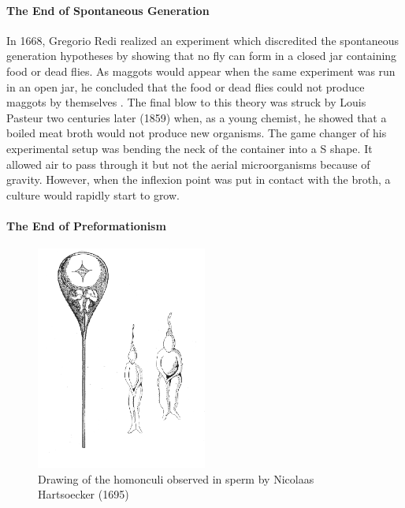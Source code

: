 \paragraph{The End of Spontaneous Generation}


In 1668, Gregorio Redi realized an experiment which discredited the spontaneous generation hypotheses by showing that no fly can form in a closed jar containing food or dead flies. As maggots would appear when the same experiment was run in an open jar, he concluded that the food or dead flies could not produce maggots by themselves \cite{Theriseofembryolo:2000uf}. The final blow to this theory was struck by Louis Pasteur two centuries later (1859) when, as a young chemist, he showed that a boiled meat broth would not produce new organisms. The game changer of his experimental setup was bending the neck of the container into a S shape. It allowed air to pass through it but not the aerial microorganisms because of gravity. However, when the inflexion point was put in contact with the broth, a culture would rapidly start to grow.

\paragraph{The End of Preformationism}

\begin{figure}
\begin{center}
\includegraphics[width=0.5\textwidth]{../../images/Development_Review/homonculi_Hartsoecker_1695.png}
\end{center}
\caption{Drawing of the homonculi observed in sperm by Nicolaas Hartsoecker (1695)}
\label{homonculi_Hartsoecker_1695}
\end{figure}

